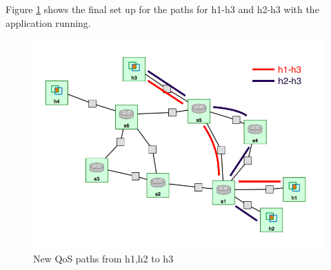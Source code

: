 \documentclass[paper=a4, fontsize=12pt]{scrartcl}	%
\numberwithin{equation}{section}		%
\numberwithin{figure}{section}			%
\numberwithin{table}{section}				%
\begin{document}
Figure \ref{Qosh3} shows the final set up for the paths for h1-h3 and h2-h3 with the application running.
\begin{figure}[H]
\begin{center}
\includegraphics[scale=0.45]{qos.png}   
\end{center}
 \caption{New QoS paths from h1,h2 to h3}
 \label{Qosh3}
\end{figure}
\end{document}

